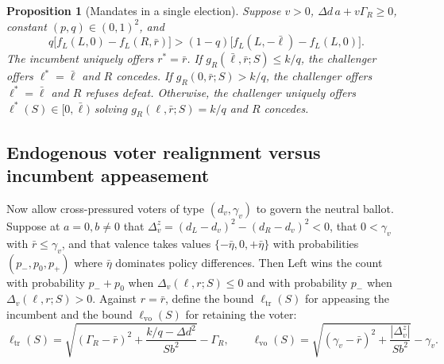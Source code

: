 \documentclass[11pt,letterpaper]{article}
\newtheorem{proposition}{Proposition}
\newcommand{\Dd}{\Delta d}
\begin{document}
\begin{proposition}[Mandates in a single election]\label{prop:onegen}
Suppose $v>0$, $\Dd\,a+v\Gamma_R\ge 0$, constant $(p,q)\in(0,1)^2$, and
\begin{equation}
 q\big[f_L(L,0)-f_L(R,\bar r)\big]>
 (1-q)\big[f_L(L,-\bar\ell)-f_L(L,0)\big] .
 \label{eq:leftone}
\end{equation}
The incumbent uniquely offers $r^*=\bar r$. If $g_R(\bar\ell,\bar r;S)\le k/q$, the challenger offers $\ell^*=\bar\ell$ and $R$ concedes. If $g_R(0,\bar r;S)>k/q$, the challenger offers $\ell^*=\bar\ell$ and $R$ refuses defeat. Otherwise, the challenger uniquely offers $\ell^*(S)\in[0,\bar\ell)$ solving $g_R(\ell,\bar r;S)=k/q$ and $R$ concedes.
\end{proposition}

\subsection{Endogenous voter realignment versus incumbent appeasement}\label{sec:realign-campaign}

Now allow cross-pressured voters of type $(d_v,\gamma_v)$ to govern the neutral ballot. Suppose at $a=0,b\ne 0$ that $\Delta_v^z=(d_L-d_v)^2-(d_R-d_v)^2<0$, that $0<\gamma_v$ with $\bar r\le\gamma_v$, and that valence takes values $\{-\bar\eta,0,+\bar\eta\}$ with probabilities $(p_-,p_0,p_+)$ where $\bar\eta$ dominates policy differences. Then Left wins the count with probability $p_-+p_0$ when $\Delta_v(\ell,r;S)\le 0$ and with probability $p_-$ when $\Delta_v(\ell,r;S)>0$. Against $r=\bar r$, define the bound $\ell_{\mathrm{tr}}(S)$ for appeasing the incumbent and the bound $\ell_{\mathrm{vo}}(S)$ for retaining the voter:
\[
 \ell_{\mathrm{tr}}(S)=\sqrt{(\Gamma_R-\bar r)^2+\frac{k/q-\Dd^2}{Sb^2}}-\Gamma_R,\qquad
 \ell_{\mathrm{vo}}(S)=\sqrt{(\gamma_v-\bar r)^2+\frac{|\Delta_v^z|}{Sb^2}}-\gamma_v.
\]
\end{document}
